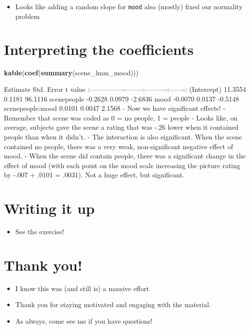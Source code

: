 \documentclass[]{article}
\newenvironment{Shaded}{}{}
\newcommand{\KeywordTok}[1]{\textcolor[rgb]{0.00,0.44,0.13}{\textbf{{#1}}}}
\newcommand{\NormalTok}[1]{{#1}}
\begin{document}
\begin{itemize}
\itemsep1pt\parskip0pt
\item
  Looks like adding a random slope for \texttt{mood} also (mostly) fixed
  our normality problem
\end{itemize}

\section{Interpreting the
coefficients}\label{interpreting-the-coefficients}

\begin{Shaded}
\begin{Highlighting}[]
\KeywordTok{kable}\NormalTok{(}\KeywordTok{coef}\NormalTok{(}\KeywordTok{summary}\NormalTok{(scene_lmm_mood)))}
\end{Highlighting}
\end{Shaded}

\textbar{} \textbar{} Estimate\textbar{} Std. Error\textbar{} t
value\textbar{}
\textbar{}:----------------\textbar{}--------:\textbar{}----------:\textbar{}-------:\textbar{}
\textbar{}(Intercept) \textbar{} 11.3554\textbar{} 0.1181\textbar{}
96.1116\textbar{} \textbar{}scenepeople \textbar{} -0.2628\textbar{}
0.0979\textbar{} -2.6836\textbar{} \textbar{}mood \textbar{}
-0.0070\textbar{} 0.0137\textbar{} -0.5148\textbar{}
\textbar{}scenepeople:mood \textbar{} 0.0101\textbar{} 0.0047\textbar{}
2.1568\textbar{} - Now we have significant effects! - Remember that
scene was coded as 0 = no people, 1 = people - Looks like, on average,
subjects gave the scene a rating that was -.26 lower when it contained
people than when it didn't. - The interaction is also significant. When
the scene contained no people, there was a very weak, non-significant
negative effect of mood. - When the scene did contain people, there was
a significant change in the effect of mood (with each point on the mood
scale increasing the picture rating by -.007 + .0101 = .0031). Not a
huge effect, but significant.

\section{Writing it up}\label{writing-it-up}

\begin{itemize}
\itemsep1pt\parskip0pt
\item
  See the exercise!
\end{itemize}

\section{Thank you!}\label{thank-you}

\begin{itemize}
\itemsep1pt\parskip0pt
\item
  I know this was (and still is) a massive effort
\item
  Thank you for staying motivated and engaging with the material.
\item
  As always, come see me if you have questions!
\end{itemize}
\end{document}
